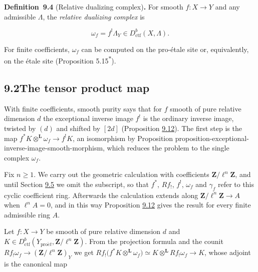 \documentclass[11pt]{article}
\newenvironment{bpstatement}[2]{\par\addvspace{0.6\baselineskip}\noindent\textbf{#1}#2\textbf{.}\enspace\ignorespaces}
  {\par\addvspace{0.4\baselineskip}}
\newcommand{\bpout}[1]{#1\textsuperscript{\hyperlink{bp-outside}{\ensuremath{\ast}}}}
\begin{document}
\label{bp11}%
\begin{bpstatement}{Definition~9.4}{ (Relative dualizing complex)}
For smooth \(f:X\to Y\) and any admissible \(\Lambda\), the \emph{relative dualizing complex} is

\[
\omega_f=f^{!}\Lambda_Y
\in D^b_{\mathrm{ctf}}(X,\Lambda).
\tag{9.3}
\]
\end{bpstatement}

\label{bp12}%
For finite coefficients, \(\omega_f\) can be computed on the pro-étale site or, equivalently, on the étale site (Proposition \bpout{5.15}).


\subsection*{\texorpdfstring{9.2\quad The tensor product map}{9.2 The tensor product map}}
\label{bp13}%
\label{bp14}%
With finite coefficients, smooth purity says that for \(f\) smooth of pure relative dimension \(d\) the exceptional inverse image \(f^!\) is the ordinary inverse image, twisted by \((d)\) and shifted by \([2d]\) (Proposition \hyperref[bp37]{9.12}). The first step is the map \(f^*K\otimes^{\mathbf L}\omega_f\to f^!K\), an isomorphism by Proposition proposition-exceptional-inverse-image-smooth-morphism, which reduces the problem to the single complex \(\omega_f\).

Fix \(n\geq1\). We carry out the geometric calculation with coefficients \(\mathbf Z/\ell^n\mathbf Z\), and until Section \hyperref[bp39]{9.5} we omit the subscript, so that \(f^*\), \(Rf_!\), \(f^!\), \(\omega_f\) and \(\gamma_f\) refer to this cyclic coefficient ring. Afterwards the calculation extends along \(\mathbf Z/\ell^n\mathbf Z\to A\) when \(\ell^nA=0\), and in this way Proposition \hyperref[bp37]{9.12} gives the result for every finite admissible ring \(A\).

Let \(f:X\to Y\) be smooth of pure relative dimension \(d\) and \(K\in D^b_{\mathrm{ctf}}(Y_{\mathrm{pro}\acute{e}t},\mathbf Z/\ell^n\mathbf Z)\). From the projection formula and the counit \(Rf_!\omega_{f}\to(\mathbf Z/\ell^n\mathbf Z)_{Y}\) we get \(Rf_!\bigl(f^{*}K\otimes^{\mathbf L}\omega_{f}\bigr)
\simeq K\otimes^{\mathbf L} Rf_!\omega_{f}\to K\), whose adjoint is the canonical map
\end{document}
